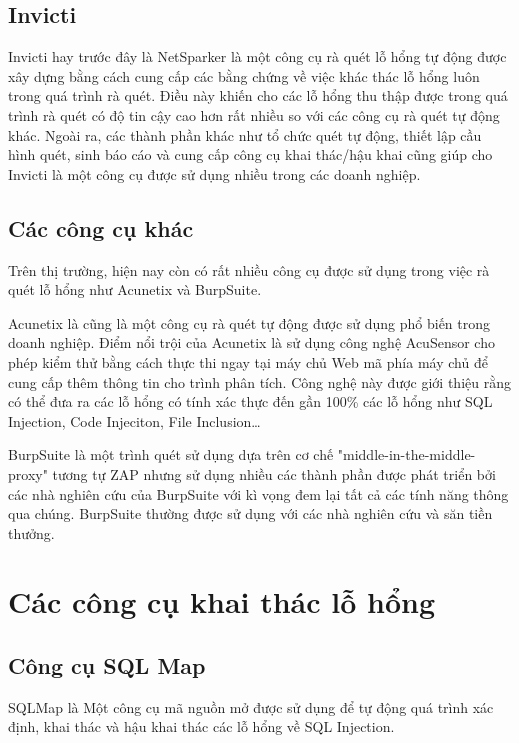 \documentclass[./../main.tex]{subfiles}
\begin{document}
\subsection{Invicti}

Invicti hay trước đây là NetSparker là một công cụ rà quét lỗ hổng tự động
được xây dựng bằng cách cung cấp các bằng chứng về việc khác thác lỗ hổng luôn
trong quá trình rà quét. Điều này khiến cho các lỗ hổng thu thập được trong
quá trình rà quét có độ tin cậy cao hơn rất nhiều so với các công cụ
rà quét tự động khác. Ngoài ra, các thành phần khác
như tổ chức quét tự động, thiết lập cầu hình quét, sinh báo cáo và cung cấp
công cụ khai thác/hậu khai cũng giúp cho Invicti là một công cụ được sử dụng
nhiều trong các doanh nghiệp.

\subsection{Các công cụ khác}

Trên thị trường, hiện nay còn có rất nhiều công cụ được sử dụng trong việc
rà quét lỗ hổng như Acunetix và BurpSuite.

Acunetix là cũng là một công cụ rà quét tự động được sử dụng phổ biến trong
doanh nghiệp. Điểm nổi trội của Acunetix là sử dụng công nghệ AcuSensor cho
phép kiểm thử bằng cách thực thi ngay tại máy chủ Web mã phía máy chủ để cung
cấp thêm thông tin cho trình phân tích. Công nghệ này được giới thiệu rằng có
thể đưa ra các lỗ hổng có tính xác thực đến gần 100\% các lỗ hổng như SQL Injection,
Code Injeciton, File Inclusion\ldots

BurpSuite là một trình quét sử dụng dựa trên cơ chế "middle-in-the-middle-proxy"
tương tự ZAP nhưng sử dụng nhiều các thành phần được phát triển bởi
các nhà nghiên cứu của BurpSuite với kì vọng đem lại tất cả các tính năng
thông qua chúng. BurpSuite thường được sử dụng với các nhà nghiên cứu và săn
tiền thưởng.

\section{Các công cụ khai thác lỗ hổng}

\subsection{Công cụ SQL Map}
SQLMap là Một công cụ mã nguồn mở được sử dụng để tự động quá trình xác
định, khai thác và hậu khai thác các lỗ hổng về SQL Injection.
\end{document}
